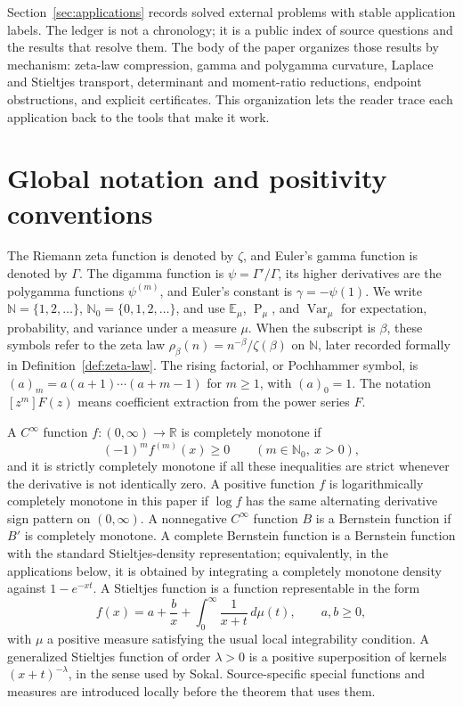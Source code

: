 \documentclass[11pt]{article}
\numberwithin{equation}{section}
\theoremstyle{definition}
\theoremstyle{remark}
\DeclareMathOperator{\Var}{Var}
\DeclareMathOperator{\Prob}{P}
\newcommand{\E}{\mathbb E}
\newcommand{\N}{\mathbb N}
\newcommand{\1}{\mathbf 1}
\begin{document}
Section~\ref{sec:applications} records solved external problems with stable
application labels.  The ledger is not a chronology; it is a public index of
source questions and the results that resolve them.  The body of the paper
organizes those results by mechanism: zeta-law compression, gamma and
polygamma curvature, Laplace and Stieltjes transport, determinant and
moment-ratio reductions, endpoint obstructions, and explicit certificates.
This organization lets the reader trace each application back to the tools
that make it work.

\section{Global notation and positivity conventions}
\label{sec:global-notation-positivity}

The Riemann zeta function is denoted by \(\zeta\), and Euler's gamma
function is denoted by \(\Gamma\).  The digamma function is
\(\psi=\Gamma'/\Gamma\), its higher derivatives are the polygamma functions
\(\psi^{(m)}\), and Euler's constant is \(\gamma=-\psi(1)\).  We write
\(\N=\{1,2,\ldots\}\), \(\mathbb N_0=\{0,1,2,\ldots\}\), and use
\(\E_\mu\), \(\Prob_\mu\), and \(\Var_\mu\) for expectation, probability, and
variance under a measure \(\mu\).  When the subscript is \(\beta\), these
symbols refer to the zeta law \(\rho_\beta(n)=n^{-\beta}/\zeta(\beta)\) on
\(\N\), later recorded formally in Definition~\ref{def:zeta-law}.  The rising factorial, or Pochhammer symbol, is
\((a)_m=a(a+1)\cdots(a+m-1)\) for \(m\ge1\), with \((a)_0=1\).  The notation
\([z^m]F(z)\) means coefficient extraction from the power series \(F\).

A \(C^\infty\) function \(f:(0,\infty)\to\mathbb R\) is completely monotone if
\[
  (-1)^m f^{(m)}(x)\ge0\qquad(m\in\mathbb N_0,\ x>0),
\]
and it is strictly completely monotone if all these inequalities are strict
whenever the derivative is not identically zero.  A positive function \(f\) is
logarithmically completely monotone in this paper if \(\log f\) has the same
alternating derivative sign pattern on \((0,\infty)\).  A nonnegative
\(C^\infty\) function \(B\) is a Bernstein function if \(B'\) is completely
monotone.  A complete Bernstein function is a Bernstein function with the
standard Stieltjes-density representation; equivalently, in the applications
below, it is obtained by integrating a completely monotone density against
\(1-e^{-xt}\).  A Stieltjes function is a function representable in the form
\[
  f(x)=a+\frac{b}{x}+\int_0^\infty \frac{1}{x+t}\,d\mu(t),
  \qquad a,b\ge0,
\]
with \(\mu\) a positive measure satisfying the usual local integrability
condition.  A generalized Stieltjes function of order \(\lambda>0\) is a
positive superposition of kernels \((x+t)^{-\lambda}\), in the sense used by
Sokal.  Source-specific special functions and measures are introduced locally
before the theorem that uses them.
\end{document}
